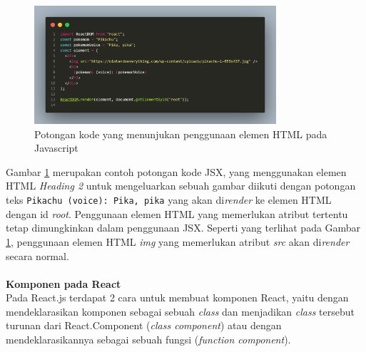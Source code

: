 \documentclass[a4paper,twoside]{article}
\begin{document}
\begin{enumerate}
		\begin{figure}[H]
            \centering
            \includegraphics[width=0.8\textwidth]{images/code-jsx.png}
            \caption{Potongan kode yang menunjukan penggunaan elemen HTML pada Javascript}
            \label{fig:react-code-jsx}
        \end{figure}
		
		\setlength\parindent{24pt}
		Gambar \ref{fig:react-code-jsx} merupakan contoh potongan kode JSX, yang menggunakan elemen HTML \textit{Heading 2} untuk mengeluarkan sebuah gambar diikuti dengan potongan teks \texttt{Pikachu (voice): Pika, pika} yang akan di\textit{render} ke elemen HTML dengan id \textit{root}. Penggunaan elemen HTML yang memerlukan atribut tertentu tetap dimungkinkan dalam penggunaan JSX. Seperti yang terlihat pada Gambar \ref{fig:react-code-jsx}, penggunaan elemen HTML \textit{img} yang memerlukan atribut \textit{src} akan di\textit{render} secara normal.
		\\
		\\
		\setlength\parindent{0pt}
		\textbf{Komponen pada React}\\
		Pada React.js terdapat 2 cara untuk membuat komponen React, yaitu dengan mendeklarasikan komponen sebagai sebuah \textit{class} dan menjadikan \textit{class} tersebut turunan dari React.Component (\textit{class component}) atau dengan mendeklarasikannya sebagai sebuah fungsi (\textit{function component}). 
		

\end{enumerate}
\end{document}
